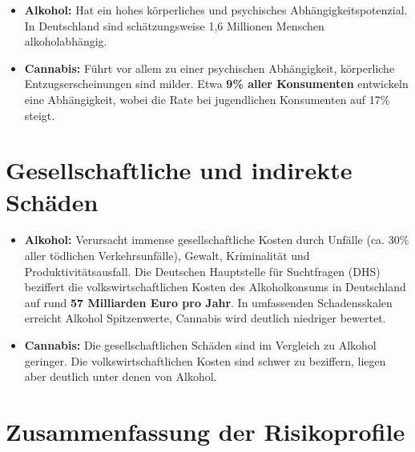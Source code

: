 \documentclass[11pt,a4paper]{article}
\begin{document}
	\begin{itemize}[leftmargin=*, noitemsep]
		\item \textbf{Alkohol:} Hat ein hohes körperliches und psychisches Abhängigkeitspotenzial. In Deutschland sind schätzungsweise 1,6 Millionen Menschen alkoholabhängig\cite{dhs-abhaengigkeit}.
		\item \textbf{Cannabis:} Führt vor allem zu einer psychischen Abhängigkeit, körperliche Entzugserscheinungen sind milder. Etwa \textbf{9\% aller Konsumenten} entwickeln eine Abhängigkeit, wobei die Rate bei jugendlichen Konsumenten auf 17\% steigt\cite{dhs-cannabis-abhaengigkeit}.
	\end{itemize}
	
	\section{Gesellschaftliche und indirekte Schäden}
	
	\begin{itemize}[leftmargin=*, noitemsep]
		\item \textbf{Alkohol:} Verursacht immense gesellschaftliche Kosten durch Unfälle (ca. 30\% aller tödlichen Verkehrsunfälle), Gewalt, Kriminalität und Produktivitätsausfall. Die Deutschen Hauptstelle für Suchtfragen (DHS) beziffert die volkswirtschaftlichen Kosten des Alkoholkonsums in Deutschland auf rund \textbf{57 Milliarden Euro pro Jahr}\cite{dhs-costs}. In umfassenden Schadensskalen erreicht Alkohol Spitzenwerte, Cannabis wird deutlich niedriger bewertet.
		\item \textbf{Cannabis:} Die gesellschaftlichen Schäden sind im Vergleich zu Alkohol geringer. Die volkswirtschaftlichen Kosten sind schwer zu beziffern, liegen aber deutlich unter denen von Alkohol.
	\end{itemize}
	
	\section{Zusammenfassung der Risikoprofile}
	
\end{document}
